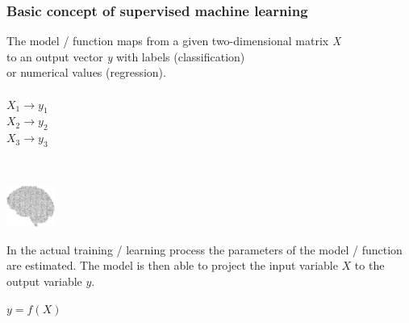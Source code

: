\documentclass[aspectratio=169]{beamer}
\begin{document}
\begin{frame}
  \frametitle{Basic concept of supervised machine learning}

  \begin{block}{}
      \begin{center}
        \vspace{0.5cm}
      The model / function maps from a given two-dimensional matrix \textit{X}\\
      to an output vector \textit{y} with labels (classification)\\ or numerical values (regression).\\
      \ \\
      
      $X_{1} \rightarrow y_{1}$\\
      $X_{2} \rightarrow y_{2}$\\
      $X_{3} \rightarrow y_{3}$\\

      \end{center}
    \end{block}
\end{frame}


\begin{frame}
  \begin{block}{}
    \vspace{0.5cm}
    \ \ \ \
    \begin{minipage}{0.10\textwidth}
      \begin{center}
        \includegraphics[width=1.6cm]{images/publicdomainvectors_Random-Alphabet-Brain.pdf}
      \end{center}        
    \end{minipage}
    \hfill
    \begin{minipage}{0.80\textwidth}
     In the actual training / learning process the parameters of the
     model / function are estimated. The model is then able to project
     the input variable $X$ to the output variable $y$.\\
     \begin{center}
       $y = f(X)$       
     \end{center}

    \end{minipage}
    \vspace{0.3cm}
  \end{block}
\end{frame}
\end{document}
